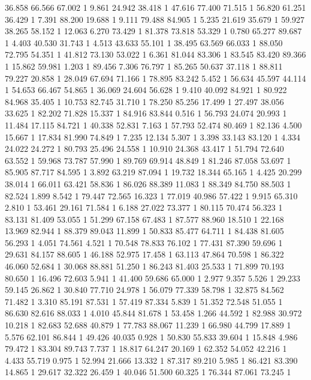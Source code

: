 	36.858	66.566	67.002	1
	9.861	24.942	38.418	1
	47.616	77.400	71.515	1
	56.820	61.251	36.429	1
	7.391	88.200	19.688	1
	9.111	79.488	84.905	1
	5.235	21.619	35.679	1
	59.927	38.265	58.152	1
	12.063	6.270	73.429	1
	81.378	73.818	53.329	1
	0.780	65.277	89.687	1
	4.403	40.530	31.743	1
	4.513	43.633	55.101	1
	38.495	63.569	66.033	1
	88.050	72.795	54.351	1
	41.812	73.130	53.022	1
	6.361	81.044	83.306	1
	83.545	83.420	89.366	1
	15.862	59.981	1.203	1
	89.456	7.306	76.797	1
	85.265	50.637	37.118	1
	88.811	79.227	20.858	1
	28.049	67.694	71.166	1
	78.895	83.242	5.452	1
	56.634	45.597	44.114	1
	54.653	66.467	54.865	1
	36.069	24.604	56.628	1
	9.410	40.092	84.921	1
	80.922	84.968	35.405	1
	10.753	82.745	31.710	1
	78.250	85.256	17.499	1
	27.497	38.056	33.625	1
	82.202	71.828	15.337	1
	84.916	83.844	0.516	1
	56.793	24.074	20.993	1
	11.484	17.115	84.721	1
	40.338	52.831	7.163	1
	57.793	52.474	80.469	1
	82.136	4.500	15.667	1
	17.834	81.990	74.849	1
	7.235	12.134	5.307	1
	3.398	33.143	83.120	1
	4.334	24.022	24.272	1
	80.793	25.496	24.558	1
	10.910	24.368	43.417	1
	51.794	72.640	63.552	1
	59.968	73.787	57.990	1
	89.769	69.914	48.849	1
	81.246	87.058	53.697	1
	85.905	87.717	84.595	1
	3.892	63.219	87.094	1
	19.732	18.344	65.165	1
	4.425	20.299	38.014	1
	66.011	63.421	58.836	1
	86.026	88.389	11.083	1
	88.349	84.750	88.503	1
	82.524	1.899	8.542	1
	79.447	72.565	16.323	1
	77.019	40.986	57.422	1
	9.915	65.310	2.810	1
	53.461	29.161	71.584	1
	6.188	27.022	73.377	1
	80.115	70.474	56.323	1
	83.131	81.409	53.055	1
	51.299	67.158	67.483	1
	87.577	88.960	18.510	1
	22.168	13.969	82.944	1
	88.379	89.043	11.899	1
	50.833	85.477	64.711	1
	84.438	81.605	56.293	1
	4.051	74.561	4.521	1
	70.548	78.833	76.102	1
	77.431	87.390	59.696	1
	29.631	84.157	88.605	1
	46.188	52.975	17.458	1
	63.113	47.864	70.598	1
	86.322	46.060	52.684	1
	30.068	88.881	51.250	1
	86.243	81.403	25.533	1
	71.899	70.193	80.650	1
	16.496	72.603	5.941	1
	41.400	59.686	65.000	1
	2.977	9.357	5.526	1
	29.233	59.145	26.862	1
	30.840	77.710	24.978	1
	56.079	77.339	58.798	1
	32.875	84.562	71.482	1
	3.310	85.191	87.531	1
	57.419	87.334	5.839	1
	51.352	72.548	51.055	1
	86.630	82.616	88.033	1
	4.010	45.844	81.678	1
	53.458	1.266	44.592	1
	82.988	30.972	10.218	1
	82.683	52.688	40.879	1
	77.783	88.067	11.239	1
	66.980	44.799	17.889	1
	5.576	62.101	86.844	1
	49.426	40.035	0.928	1
	50.830	55.833	39.604	1
	15.848	4.986	79.472	1
	83.304	89.743	7.737	1
	18.817	64.247	20.169	1
	62.352	54.052	42.216	1
	4.433	55.719	0.975	1
	52.994	21.666	13.332	1
	87.317	89.210	5.985	1
	86.421	83.390	14.865	1
	29.617	32.322	26.459	1
	40.046	51.500	60.325	1
	76.344	87.061	73.245	1
